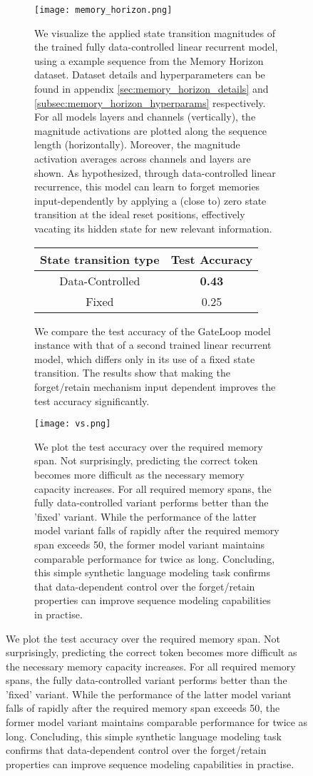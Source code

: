 \documentclass{article} \usepackage{iclr2024_conference,times}
\begin{document}
\begin{figure}[H]
\begin{minipage}{0.6\textwidth}
\begin{figure}[H]
    \begin{center}
        \texttt{[image: memory\_horizon.png]}
    \end{center}
    \caption{We visualize the applied state transition magnitudes of the trained fully data-controlled linear recurrent model, using a example sequence from the Memory Horizon dataset. Dataset details and hyperparameters can be found in appendix \ref{sec:memory_horizon_details} and \ref{subsec:memory_horizon_hyperparams} respectively. For all models layers and channels (vertically), the magnitude activations are plotted along the sequence length (horizontally). Moreover, the magnitude activation averages across channels and layers are shown. As hypothesized, through data-controlled linear recurrence, this model can learn to forget memories input-dependently by applying a (close to) zero state transition at the ideal reset positions, effectively vacating its hidden state for new relevant information.}
\end{figure}



\begin{figure}[H]
    \centering
    \begin{tabular}{cc}
        \toprule
        State transition type & Test Accuracy \\ 
        \midrule
        Data-Controlled & \textbf{0.43} \\ 
        Fixed & 0.25 \\ 
        \bottomrule
    \end{tabular}
    \caption{We compare the test accuracy of the GateLoop model instance with that of a second trained linear recurrent model, which differs only in its use of a fixed state transition. The results show that making the forget/retain mechanism input dependent improves the test accuracy significantly.}
    \label{fig:test_accuracy_table}
\end{figure}

\begin{figure}[H]
    \centering
    \texttt{[image: vs.png]}
    \caption{We plot the test accuracy over the required memory span. Not surprisingly, predicting the correct token becomes more difficult as the necessary memory capacity increases. For all required memory spans, the fully data-controlled variant performs better than the 'fixed' variant. While the performance of the latter model variant falls of rapidly after the required memory span exceeds 50, the former model variant maintains comparable performance for twice as long. Concluding, this simple synthetic language modeling task confirms that data-dependent control over the forget/retain properties can improve sequence modeling capabilities in practise.}
    \label{fig:accuracy_memory_span}
\end{figure}


\end{minipage}
\end{figure}
\end{document}
